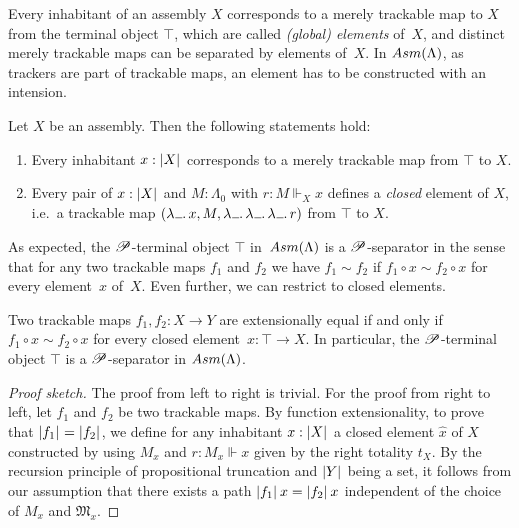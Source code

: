 \documentclass[draft,a4paper,UKenglish,numberwithinsect,cleveref,thm-restate]{lipics-v2021}
\numberwithin{equation}{section}
\theoremstyle{definition}
\theoremstyle{plain}
\begin{document}
Every inhabitant of an assembly $X$ corresponds to a merely trackable map to $X$ from the terminal object $\top$, which are called \emph{(global) elements} of~$X$, and distinct merely trackable maps can be separated by elements of~$X$.
In $\Asm(\Lambda)$, as trackers are part of trackable maps, an element has to be constructed with an intension.
\begin{lemma}\label{lem:global-element}
  Let $X$ be an assembly. Then the following statements hold:
  \begin{enumerate}
    \item Every inhabitant $x : \mathopen{}\left|X\right|_{}^{}\mathclose{}$ corresponds to a merely trackable map from $\top$ to $X$.
    \item Every pair of $x : \mathopen{}\left|X\right|_{}^{}\mathclose{}$ and $M : \Lambda_0$ with $r : M \Vdash_X x$ defines a \emph{closed} element of $X$, i.e.\ a trackable map $(\lambda\anonymous.\, x, M, \lambda\anonymous.\,\lambda\anonymous.\, \lambda\anonymous.\, r)$ from $\top$ to $X$.
  \end{enumerate}
\end{lemma}

As expected, the $\mathscr{P}$-terminal object $\top$ in~$\Asm(\Lambda)$ is a $\mathscr{P}$-separator in the sense that for any two trackable maps $f_1$ and $f_2$ we have $f_1 \sim f_2$ if $f_1 \circ x \sim f_2 \circ x$ for every element~$x$ of~$X$.
Even further, we can restrict to closed elements.
\begin{proposition}
  Two trackable maps $f_1, f_2\colon X \to Y$ are extensionally equal if and only if $f_1 \circ x \sim f_2 \circ x$ for every closed element~$x\colon \top \to X$.
  In particular, the $\mathscr{P}$-terminal object $\top$ is a $\mathscr{P}$-separator in $\Asm(\Lambda)$.
\end{proposition}
\begin{proof}[Proof sketch]
  The proof from left to right is trivial.
  For the proof from right to left, let $f_1$ and $f_2$ be two trackable maps.
  By function extensionality, to prove that $\mathopen{}\left|f_1\right|_{}^{}\mathclose{} = \mathopen{}\left|f_2\right|_{}^{}\mathclose{}$, we define for any inhabitant $x : \mathopen{}\left|X\right|_{}^{}\mathclose{}$ a closed element $\hat{x}$ of $X$ constructed by  using $M_x$ and $r : M_x \Vdash x$ given by the right totality $t_X$.
  By the recursion principle of propositional truncation and $\mathopen{}\left|Y\right|_{}^{}\mathclose{}$ being a set, it follows from our assumption that there exists a path $\mathopen{}\left|f_1\right|_{}^{}\mathclose{}\,x = \mathopen{}\left|f_2\right|_{}^{}\mathclose{}\, x$ independent of the choice of $M_x$ and $\mathfrak{M}_x$.
\end{proof}
\end{document}
